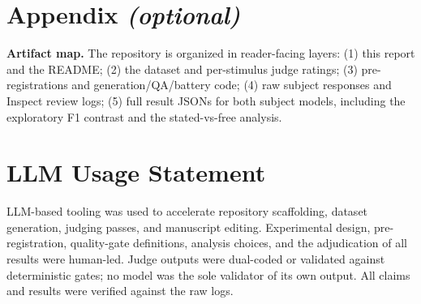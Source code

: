 \documentclass[11pt]{article}
\begin{document}
\section*{Appendix \textit{(optional)}}

\noindent\textbf{Artifact map.} The repository is organized in reader-facing layers: (1) this report and the README; (2) the dataset and per-stimulus judge ratings; (3) pre-registrations and generation/QA/battery code; (4) raw subject responses and Inspect review logs; (5) full result JSONs for both subject models, including the exploratory F1 contrast and the stated-vs-free analysis.

\section*{LLM Usage Statement}

LLM-based tooling was used to accelerate repository scaffolding, dataset generation, judging passes, and manuscript editing. Experimental design, pre-registration, quality-gate definitions, analysis choices, and the adjudication of all results were human-led. Judge outputs were dual-coded or validated against deterministic gates; no model was the sole validator of its own output. All claims and results were verified against the raw logs.
\end{document}
